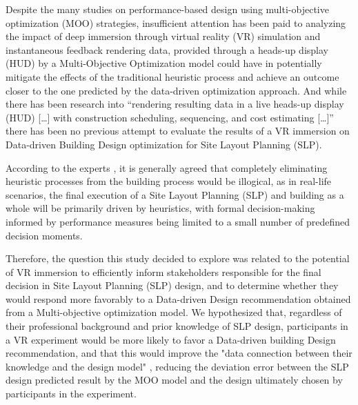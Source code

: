 Despite the many studies on performance-based design using multi-objective optimization (MOO) strategies, insufficient attention has been paid to analyzing the impact of deep immersion through virtual reality (VR) simulation and instantaneous feedback rendering data, provided through a heads-up display (HUD) by a Multi-Objective Optimization model could have in potentially mitigate the effects of the traditional heuristic process and achieve an outcome closer to the one predicted by the data-driven optimization approach. And while there has been research into “rendering resulting data in a live heads-up display (HUD) […] with construction scheduling, sequencing, and cost estimating […]” \cite{Hemsath2012} there has been no previous attempt to evaluate the results of a VR immersion on Data-driven Building Design optimization for Site Layout Planning (SLP).

According to the experts \cite{Augenbroe2012}, it is generally agreed that completely eliminating heuristic processes from the building process would be illogical, as in real-life scenarios, the final execution of a Site Layout Planning (SLP) and building as a whole will be primarily driven by heuristics, with formal decision-making informed by performance measures being limited to a small number of predefined decision moments.

Therefore, the question this study decided to explore was related to the potential of VR immersion to efficiently inform stakeholders responsible for the final decision in Site Layout Planning (SLP) design, and to determine whether they would respond more favorably to a Data-driven Design recommendation obtained from a Multi-objective optimization model. We hypothesized that, regardless of their professional background and prior knowledge of SLP design, participants in a VR experiment would be more likely to favor a Data-driven building Design recommendation, and that this would improve the "data connection between their knowledge and the design model" \cite{Augenbroe2012}, reducing the deviation error between the SLP design predicted result by the MOO model and the design ultimately chosen by participants in the experiment.

        

